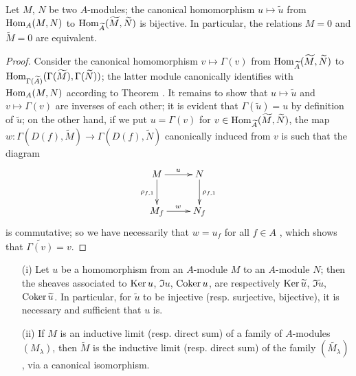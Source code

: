 \begin{cor}[1.3.8]
\label{1.1.3.8}
Let $M$, $N$ be two $A$-modules; the canonical homomorphism $u\mapsto\widetilde{u}$ from
${\mathop{\mathrm{Hom}}\nolimits}_A(M,N)$ to ${\mathop{\mathrm{Hom}}\nolimits}_{\widetilde{A}}(\widetilde{M},\widetilde{N})$ is bijective. In
particular, the relations $M=0$ and $\widetilde{M}=0$ are equivalent.
\end{cor}

\begin{proof}
\label{proof-1.1.3.8}
Consider the canonical homomorphism $v\mapsto\Gamma(v)$ from
${\mathop{\mathrm{Hom}}\nolimits}_{\widetilde{A}}(\widetilde{M},\widetilde{N})$ to
${\mathop{\mathrm{Hom}}\nolimits}_{\Gamma(\widetilde{A})}(\Gamma(\widetilde{M}),\Gamma(\widetilde{N}))$; the latter
module canonically identifies with ${\mathop{\mathrm{Hom}}\nolimits}_A(M,N)$ according to Theorem .
It remains to show that $u\mapsto\widetilde{u}$ and $v\mapsto\Gamma(v)$ are inverses of each
other; it is evident that $\Gamma(\widetilde{u})=u$ by definition of $\widetilde{u}$; on the
other hand, if we put $u=\Gamma(v)$ for
$v\in{\mathop{\mathrm{Hom}}\nolimits}_{\widetilde{A}}(\widetilde{M},\widetilde{N})$, the map
$w:\Gamma(D(f),\widetilde{M})\to\Gamma(D(f),\widetilde{N})$ canonically induced from $v$
is such that the diagram
\[
  \xymatrix{
    M\ar[r]^u\ar[d]_{\rho_{f,1}} & N\ar[d]^{\rho_{f,1}}\\
    M_f\ar[r]^w & N_f
  }
\]
is commutative; so we have necessarily that $w=u_f$ for all $f\in A$
, which shows that $\widetilde{\Gamma(v)}=v$.
\end{proof}

\begin{cor}[1.3.9]
\label{1.1.3.9}
\medskip\noindent
\begin{itemize}
  \item[{\rm(i)}] Let $u$ be a homomorphism from an $A$-module $M$ to an $A$-module $N$; then the
    sheaves associated to ${\mathop{\mathrm{Ker}}\nolimits}\, u$, $\Im u$, ${\mathop{\mathrm{Coker}}\nolimits}\, u$, are respectively
    ${\mathop{\mathrm{Ker}}\nolimits}\,\widetilde{u}$, $\Im\widetilde{u}$, ${\mathop{\mathrm{Coker}}\nolimits}\,\widetilde{u}$. In particular, for
    $\widetilde{u}$ to be injective (resp. surjective, bijective), it is necessary and
    sufficient that $u$ is.
  \item[{\rm(ii)}] If $M$ is an inductive limit (resp. direct sum) of a family of $A$-modules
    $(M_\lambda)$, then $\widetilde{M}$ is the inductive limit (resp. direct sum) of the
    family $(\widetilde{M_\lambda})$, via a canonical isomorphism.
\end{itemize}
\end{cor}

